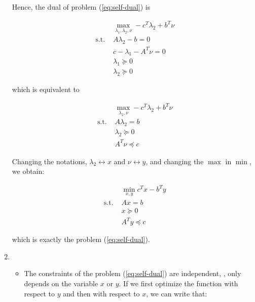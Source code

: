 \documentclass[a4paper, 11pt]{report}
\begin{document}
\begin{enumerate}
    Hence, the dual of problem (\ref{eq:self-dual}) is
    
    \begin{equation*}
        \begin{aligned}
        & \max_{\lambda_{1}, \lambda_{2}, \nu}
        - c^{T} \lambda_{2} + b^{T} \nu \\
        \text{ s.t. }
        & A \lambda_{2} - b = 0 \\
        & c - \lambda_{1} - A^{T} \nu = 0 \\
        & \lambda_{1} \succeq 0 \\
        & \lambda_{2} \succeq 0
        \end{aligned}
    \end{equation*}
    
    \pagebreak
    
    which is equivalent to
    
    \begin{equation*}
        \begin{aligned}
        & \max_{\lambda_{2}, \nu}
        - c^{T} \lambda_{2} + b^{T} \nu \\
        \text{ s.t. }
        & A \lambda_{2} = b \\
        & \lambda_{2} \succeq 0 \\
        & A^{T} \nu \preceq c
        \end{aligned}
    \end{equation*}
    
    Changing the notations, $\lambda_{2} \leftrightarrow x$ and $\nu \leftrightarrow y$, and changing the $\max$ in $\min$, we obtain:
    
    \begin{equation*}
        \boxed{\begin{aligned}
        & \min_{x, y}
        c^{T} x - b^{T} y \\
        \text{ s.t. }
        & A x = b \\
        & x \succeq 0 \\
        & A^{T} y \preceq c
        \end{aligned}}
    \end{equation*}
    
    which is exactly the problem (\ref{eq:self-dual}). \\
    
    \item 
    \begin{itemize}
    \item The constraints of the problem (\ref{eq:self-dual}) are independent, \ie, only depends on the variable $x$ or $y$. If we first optimize the function with respect to $y$ and then with respect to $x$, we can write that:
    

\end{itemize}
\end{enumerate}
\end{document}
